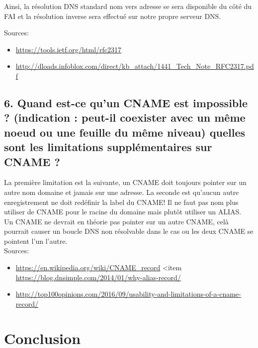 \documentclass{article}
\begin{document}
Ainsi, la résolution DNS standard nom vers adresse se sera disponible du côté du FAI et la résolution inverse sera effectué sur notre propre serveur DNS.

Sources:
\begin{itemize}
\item \url{https://tools.ietf.org/html/rfc2317}
\item \url{http://dloads.infoblox.com/direct/kb_attach/1441_Tech_Note_RFC2317.pdf}
\end{itemize}

\subsection*{6. Quand est-ce qu’un CNAME est impossible ? (indication : peut-il coexister avec un même noeud ou une feuille du même niveau) quelles sont les limitations supplémentaires sur CNAME ?}
La première limitation est la suivante, un CNAME doit toujours pointer sur un autre nom domaine et jamais sur une adresse. La seconde est qu'aucun autre enregistrement ne doit redéfinir la label du CNAME! Il ne faut pas nom plus utiliser de CNAME pour le racine du domaine mais plutôt utiliser un ALIAS.\\

Un CNAME ne devrait en théorie pas pointer sur un autre CNAME, celà pourrait causer un boucle DNS non résolvable dans le cas ou les deux CNAME se pointent l'un l'autre.\\

Sources:
\begin{itemize}
\item \url{https://en.wikipedia.org/wiki/CNAME_record}
<item \url{https://blog.dnsimple.com/2014/01/why-alias-record/}
\item \url{http://top100opinions.com/2016/09/usability-and-limitations-of-a-cname-record/}
\end{itemize}
\section{Conclusion}

\printbibliography
\end{document}
